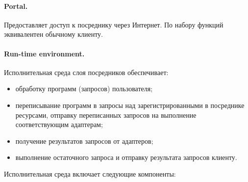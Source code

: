 \begin{multicols}{2}
\vspace*{-3pt}
\paragraph*{Portal.} Предоставляет доступ к посреднику через Интернет. По набору
функций эквивалентен обычному клиенту.

\vspace*{-3pt}
\paragraph*{Run-time environment.} Исполнительная среда слоя посредников
обеспечивает:
\begin{itemize}
\item обработку программ (запросов) пользователя;
\item переписывание программ в запросы над зарегистрированными
в посреднике ресурсами,
 отправку переписанных запросов на выполнение соответствующим адаптерам;
\item получение результатов запросов от адаптеров;
\item выполнение остаточного запроса и отправку результата запросов клиенту.
\end{itemize}

Исполнительная среда включает следующие компоненты:

\end{multicols}

\begin{figure} %
\vspace*{1pt}
\begin{center}
\mbox{%
\epsfxsize=127.109mm
}
\end{center}
\vspace*{-9pt}
\end{figure}

